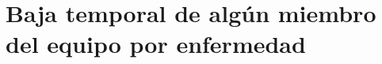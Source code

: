 \documentclass[spanish,a4paper,12pt]{report}	%
\begin{document}
	\section*{Baja temporal de algún miembro del equipo por enfermedad}
		


\newpage
\mbox{}
\thispagestyle{empty}						%
\newpage
\end{document}
